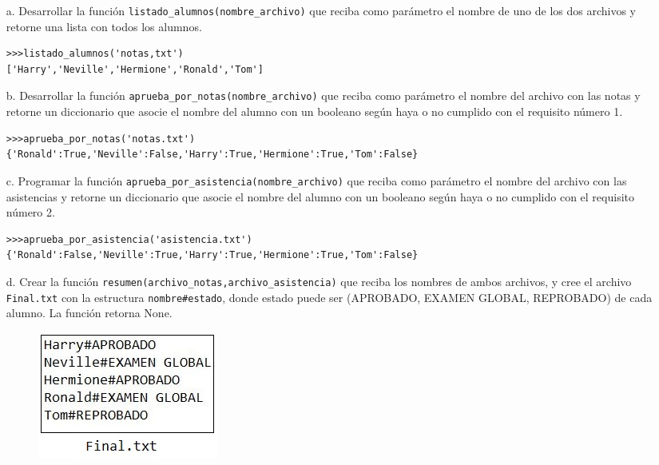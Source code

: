 \begin{itemize}
    \item[a.] Desarrollar la función \texttt{listado\_alumnos(nombre\_archivo)} que reciba como parámetro el nombre de uno de los dos archivos y retorne una lista con todos los alumnos.
    \begin{lstlisting}[style=consola]
>>>listado_alumnos('notas,txt')
['Harry','Neville','Hermione','Ronald','Tom']
    \end{lstlisting}
    \item[b.] Desarrollar la función \texttt{aprueba\_por\_notas(nombre\_archivo)} que reciba como parámetro el nombre del archivo con las notas y retorne un diccionario que asocie el nombre del alumno con un booleano según haya o no cumplido con el requisito número 1.
    \begin{lstlisting}[style=consola]
>>>aprueba_por_notas('notas.txt')
{'Ronald':True,'Neville':False,'Harry':True,'Hermione':True,'Tom':False}
    \end{lstlisting}
    \item[c.] Programar la función \texttt{aprueba\_por\_asistencia(nombre\_archivo)} que reciba como parámetro el nombre del archivo con las asistencias y retorne un diccionario que asocie el nombre del alumno con un booleano según haya o no cumplido con el requisito número 2.
    \begin{lstlisting}[style=consola]
>>>aprueba_por_asistencia('asistencia.txt')
{'Ronald':False,'Neville':True,'Harry':True,'Hermione':True,'Tom':False}
    \end{lstlisting}
    \item[d.] Crear la función \texttt{resumen(archivo\_notas,archivo\_asistencia)} que reciba los nombres de ambos archivos, y cree el archivo \texttt{Final.txt} con la estructura \texttt{nombre\#estado}, donde estado puede ser (APROBADO, EXAMEN GLOBAL, REPROBADO) de cada alumno. La función retorna None.
    \begin{figure}[h]
    \centering
    \includegraphics[scale=0.9]{Imagenes/final.jpg}
    \end{figure}
\end{itemize}